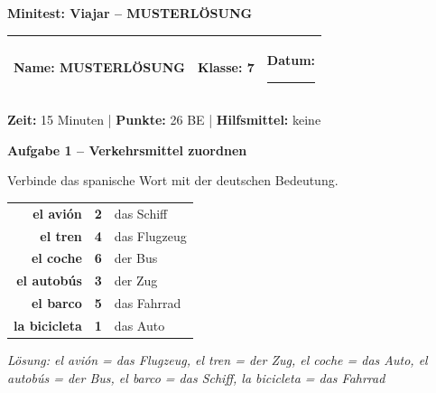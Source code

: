 \documentclass[11pt, a4paper]{article}
\newcommand{\fachfarbe}{spanisch}
\newcommand{\thema}{Minitest: Viajar -- MUSTERLÖSUNG}
\newcommand{\klasse}{7}
\newcommand{\maxpunkte}{26}
\newcommand{\zeit}{15 Minuten}
\newcommand{\punktebox}[1]{\hfill\fbox{\small \_/#1}}
\newcommand{\luecke}[1]{\rule{#1}{0.4pt}}
\newcommand{\lsg}[1]{\textcolor{loesung}{\textbf{#1}}}
\newenvironment{aufgabe}[1]{%
    \needspace{5\baselineskip}%
    \nopagebreak[4]%
    \vspace{10pt}
    \noindent\textbf{\textcolor{\fachfarbe}{Aufgabe #1}}
    \nopagebreak[4]%
    \vspace{5pt}
    \nopagebreak[4]%
    \begin{list}{}{\leftmargin=0pt}
    \item[]
}{%
    \end{list}
}
\newcommand{\es}[1]{\textcolor{\fachfarbe}{\textbf{#1}}}
\begin{document}

\begin{center}
    {\Large\bfseries\textcolor{\fachfarbe}{\thema}}
\end{center}

\vspace{5pt}

\noindent
\begin{tabularx}{\textwidth}{|X|X|X|}
\hline
\textbf{Name:} \lsg{MUSTERLÖSUNG} &
\textbf{Klasse:} \klasse &
\textbf{Datum:} \luecke{2cm} \\
\hline
\end{tabularx}

\vspace{10pt}

\begin{infobox}
\textbf{Zeit:} \zeit{} | \textbf{Punkte:} \maxpunkte{} BE | \textbf{Hilfsmittel:} keine
\end{infobox}

\vspace{15pt}


\begin{aufgabe}{1 -- Verkehrsmittel zuordnen}
Verbinde das spanische Wort mit der deutschen Bedeutung. \punktebox{6}
\end{aufgabe}

\begin{center}
\begin{tabular}{rcl}
\es{el avión} & \lsg{2} & das Schiff \\[0.8em]
\es{el tren} & \lsg{4} & das Flugzeug \\[0.8em]
\es{el coche} & \lsg{6} & der Bus \\[0.8em]
\es{el autobús} & \lsg{3} & der Zug \\[0.8em]
\es{el barco} & \lsg{5} & das Fahrrad \\[0.8em]
\es{la bicicleta} & \lsg{1} & das Auto \\
\end{tabular}
\end{center}

\textit{Lösung: el avión = das Flugzeug, el tren = der Zug, el coche = das Auto, el autobús = der Bus, el barco = das Schiff, la bicicleta = das Fahrrad}
\end{document}
